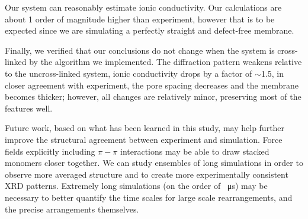 \documentclass[journal=jpcbfk,manuscript=article]{achemso}
\begin{document}

  Our system can reasonably estimate ionic conductivity. Our
  calculations are about 1 order of magnitude higher than experiment, however
  that is to be expected since we are simulating a perfectly straight and
  defect-free membrane. 

  Finally, we verified that our conclusions do not change when the system is
  cross-linked by the algorithm we implemented. The diffraction pattern weakens
  relative to the uncross-linked system, 
  ionic conductivity drops by a factor
  of $\sim$1.5, in closer agreement with experiment, the pore spacing decreases and
  the membrane becomes thicker; however, all changes are relatively minor, 
  preserving most of the features well.


  Future work, based on what has been learned in this study, may help further
  improve the structural agreement between experiment and simulation. Force 
  fields explicitly including $\pi-\pi$ interactions may be able to draw stacked
  monomers closer together. We can study ensembles of long simulations in order
  to observe more averaged structure and to create more experimentally consistent
  XRD patterns. Extremely long simulations (on the order of \SI{}{\micro s}) may
  be necessary to better quantify the time scales for large scale rearrangements,
  and the precise arrangements themselves.
\end{document}
